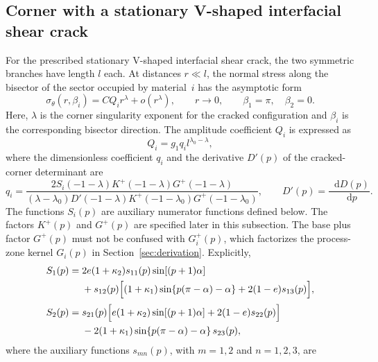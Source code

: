 \documentclass[pdflatex,onecolumn,sn-mathphys-ay]{sn-jnl}
\newcommand{\dd}{\mathop{}\!\mathrm{d}}
\begin{document}
\subsection{Corner with a stationary V-shaped interfacial shear crack}

For the prescribed stationary V-shaped interfacial shear crack, the two
symmetric branches have length $l$ each. At distances $r\ll l$, the normal stress along the bisector
of the sector occupied by material~$i$ has the asymptotic
form~\citep{NazarenkoKipnis2022Stress}
\begin{equation}
\label{eq:app-cracked-field}
  \sigma_\theta(r,\beta_i)
  =CQ_i r^\lambda+o\!\left(r^\lambda\right),
  \qquad r\to0,
  \qquad
  \beta_1=\pi,\quad \beta_2=0.
\end{equation}
Here, $\lambda$ is the corner singularity exponent for the cracked
configuration and $\beta_i$ is the corresponding bisector direction.
The amplitude coefficient $Q_i$ is expressed as
\begin{equation*}
  Q_i=g_1q_i l^{\lambda_0-\lambda},
\end{equation*}
where the dimensionless coefficient $q_i$ and the derivative $D'(p)$
of the cracked-corner determinant are
\begin{equation*}
  q_i=
  \frac{2S_i(-1-\lambda)K^+(-1-\lambda)G^+(-1-\lambda)}
  {(\lambda-\lambda_0)D'(-1-\lambda)
   K^+(-1-\lambda_0)G^+(-1-\lambda_0)},
  \qquad
  D'(p)=\frac{\dd D(p)}{\dd p}.
\end{equation*}
The functions $S_i(p)$ are auxiliary numerator functions defined below.
The factors $K^+(p)$ and $G^+(p)$ are specified later in this subsection.
The base plus factor $G^+(p)$ must not be confused with $G_i^+(p)$, which
factorizes the process-zone kernel $G_i(p)$ in
Section~\ref{sec:derivation}. Explicitly,
\begin{equation*}
\begin{aligned}
  S_1(p)={}&2e(1+\kappa_2)s_{11}(p)\sin[(p+1)\alpha]\\
  &+s_{12}(p)
  \Bigl[(1+\kappa_1)\sin\{p(\pi-\alpha)-\alpha\}
        +2(1-e)s_{13}(p)\Bigr],\\[2pt]
  S_2(p)={}&s_{21}(p)
  \Bigl[e(1+\kappa_2)\sin[(p+1)\alpha]
        +2(1-e)s_{22}(p)\Bigr]\\
  &-2(1+\kappa_1)\sin\{p(\pi-\alpha)-\alpha\}\,s_{23}(p),
\end{aligned}
\end{equation*}
where the auxiliary functions $s_{mn}(p)$, with $m=1,2$ and
$n=1,2,3$, are
\end{document}
